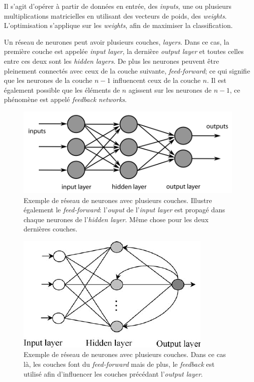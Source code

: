 \documentclass[a4paper, 11pt]{article}
\begin{document}
Il s'agit d'opérer à partir de données en entrée, des \textit{inputs}, une ou plusieurs multiplications matricielles en utilisant des vecteurs de poids, des \textit{weights}. L'optimisation s'applique sur les \textit{weights}, afin de maximiser la classification.

Un réseau de neurones peut avoir plusieurs couches, \textit{layers}. Dans ce cas, la première couche est appelée \textit{input layer}, la dernière \textit{output layer} et toutes celles entre ces deux sont les \textit{hidden layers}. De plus les neurones peuvent être pleinement connectés avec ceux de la couche suivante, \textit{feed-forward}; ce qui signifie que les neurones de la couche $n-1$ influencent ceux de la couche $n$. Il est également possible que les éléments de $n$ agissent sur les neurones de $n-1$, ce phénomène est appelé \textit{feedback networks}.

\begin{figure}[H]
\centering
\includegraphics[scale=0.4]{images/neural_net_feedforward}
\caption[]{Exemple de réseau de neurones avec plusieurs couches. Illustre également le \textit{feed-forward}: l'\textit{ouput} de l'\textit{input layer} est propagé dans chaque neurones de l'\textit{hidden layer}. Même chose pour les deux dernières couches.\footnotemark}
\end{figure}


\begin{figure}[H]
\centering
\includegraphics{images/neural_net_feedback}
\caption[]{Exemple de réseau de neurones avec plusieurs couches. Dans ce cas là, les couches font du \textit{feed-forward} mais de plus, le \textit{feedback} est utilisé afin d'influencer les couches précédant l'\textit{output layer}.\footnotemark}
\end{figure}
\end{document}
